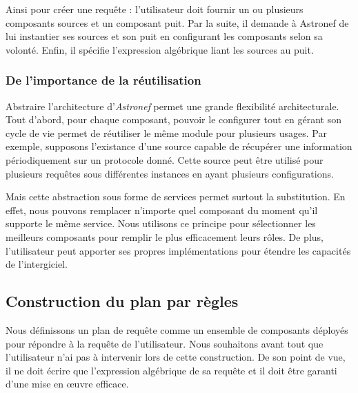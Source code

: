 Ainsi pour créer une requête : l'utilisateur doit fournir un ou plusieurs composants sources et un composant puit. Par la suite, il demande à Astronef de lui instantier ses sources et son puit en configurant les composants selon sa volonté. Enfin, il spécifie l'expression algébrique liant les sources au puit.

\subsubsection{De l'importance de la réutilisation}
Abstraire l'architecture d'\textit{Astronef} permet une grande flexibilité architecturale. Tout d'abord, pour chaque composant, pouvoir le configurer tout en gérant son cycle de vie permet de réutiliser le même module pour plusieurs usages. Par exemple, supposons l'existance d'une source capable de récupérer une information périodiquement sur un protocole donné. Cette source peut être utilisé pour plusieurs requêtes sous différentes instances en ayant plusieurs configurations.

Mais cette abstraction sous forme de services permet surtout la substitution. En effet, nous pouvons remplacer n'importe quel composant du moment qu'il supporte le même service. Nous utilisons ce principe pour sélectionner les meilleurs composants pour remplir le plus efficacement leurs rôles. De plus, l'utilisateur peut apporter ses propres implémentations pour étendre les capacités de l'intergiciel.

\subsection{Construction du plan par règles}
Nous définissons un plan de requête comme un ensemble de composants déployés pour répondre à la requête de l'utilisateur. Nous souhaitons avant tout que l'utilisateur n'ai pas à intervenir lors de cette construction. De son point de vue, il ne doit écrire que l'expression algébrique de sa requête et il doit être garanti d'une mise en œuvre efficace.

